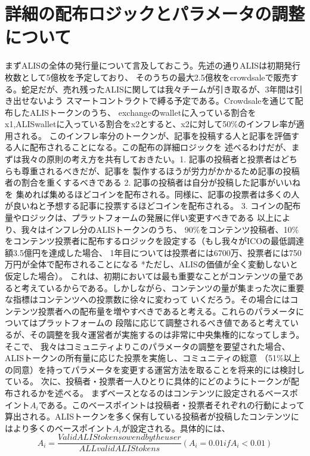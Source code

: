 \documentclass{jsarticle}
\begin{document}
\section{詳細の配布ロジックとパラメータの調整について}
まずALISの全体の発行量について言及しておこう。先述の通りALISは初期発行枚数として5億枚を予定しており、
そのうちの最大2.5億枚をcrowdsaleで販売する。蛇足だが、売れ残ったALISに関しては我々チームが引き取るが、3年間は引き出せないよう
スマートコントラクトで縛る予定である。Crowdsaleを通じて配布したALISトークンのうち、
exchangeのwalletに入っている割合をx1,ALISwalletに入っている割合をx2とすると、x2に対して50\%のインフレ率が適用される。
このインフレ率分のトークンが、記事を投稿する人と記事を評価する人に配布されることになる。この配布の詳細ロジックを
述べるわけだが、まずは我々の原則の考え方を共有しておきたい。1. 記事の投稿者と投票者はどちらも尊重されるべきだが、記事を
製作するほうが労力がかかるため記事の投稿者の割合を重くするべきである 2. 記事の投稿者は自分が投稿した記事がいいねを
集めれば集めるほどコインを配布される。同様に、記事の投票者は多くの人が良いねと予想する記事に投票するほどコインを配布される。 
3. コインの配布量やロジックは、プラットフォームの発展に伴い変更すべきである 以上により、我々はインフレ分のALISトークンのうち、
90\%をコンテンツ投稿者、10\%をコンテンツ投票者に配布するロジックを設定する（もし我々がICOの最低調達額3.5億円を達成した場合、
1年目については投票者には6700万、投票者には750万円が全体で配布されることになる *ただし、ALISの価値が全く変動しないと仮定した場合）。
これは、初期においては最も重要なことがコンテンツの量であると考えているからである。しかしながら、コンテンツの量が集まった次に重要な指標はコンテンツへの投票数に徐々に変わって
いくだろう。その場合にはコンテンツ投票者への配布量を増やすべきであると考える。これらのパラメータについてはプラットフォームの
段階に応じて調整されるべき値であると考えているが、その調整を我々運営者が実施するのは非常に中央集権的になってしまう。そこで、
我々はコミュニティよりこのパラメータの調整を要望された場合、ALISトークンの所有量に応じた投票を実施し、コミュニティの総意
（51\%以上の同意）を持ってパラメータを変更する運営方法を取ることを将来的には検討している。
次に、投稿者・投票者一人ひとりに具体的にどのようにトークンが配布されるかを述べる。
まずベースとなるのはコンテンツに設定されるベースポイント$A_{i}$である。このベースポイントは投稿者・投票者それぞれの行動によって
算出される。ALISトークンを多く保有している投稿者が投稿したコンテンツにはより多くのベースポイント$A_{i}$が設定される。具体的には、
\begin{equation}
A_{i} = \frac{Valid ALIS tokens owend by the user}{ALL valid ALIS tokens} (A_{i} = 0.01 if A_{i} < 0.01)
\end{equation} 
\end{document}
